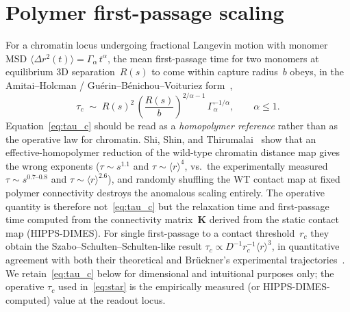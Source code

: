 \documentclass[11pt]{article}
\begin{document}
\section{Polymer first-passage scaling}
\label{sec:scaling}

For a chromatin locus undergoing fractional Langevin motion with monomer
MSD $\langle\Delta r^{2}(t)\rangle = \Gamma_{\alpha}\,t^{\alpha}$, the
mean first-passage time for two monomers at equilibrium 3D
separation~$R(s)$ to come within capture radius~$b$ obeys, in the
Amitai--Holcman / Gu\'erin--B\'enichou--Voituriez
form~\cite{Amitai2013,Guerin2016},
\begin{equation}
  \tau_c
  \;\sim\;
  R(s)^{2}\,\left(\frac{R(s)}{b}\right)^{2/\alpha-1}\,
  \Gamma_{\alpha}^{-1/\alpha},\qquad \alpha\le 1.
  \label{eq:tau_c}
\end{equation}
Equation~\eqref{eq:tau_c} should be read as a \emph{homopolymer reference}
rather than as the operative law for chromatin. Shi, Shin, and
Thirumalai~\cite{Shi2025} show that an effective-homopolymer reduction of
the wild-type chromatin distance map gives the wrong exponents
($\tau\sim s^{1.1}$ and $\tau\sim\langle r\rangle^{4}$, vs.\ the
experimentally measured $\tau\sim s^{0.7\text{--}0.8}$ and
$\tau\sim\langle r\rangle^{2.6}$), and randomly shuffling the WT contact
map at fixed polymer connectivity destroys the anomalous scaling
entirely. The operative quantity is therefore not~\eqref{eq:tau_c} but the
relaxation time and first-passage time computed from the connectivity
matrix~$\mathbf{K}$ derived from the static contact map (HIPPS-DIMES). For
single first-passage to a contact threshold~$r_c$ they obtain the
Szabo--Schulten--Schulten-like result $\tau_c\propto
D^{-1}r_c^{-1}\langle r\rangle^{3}$, in quantitative agreement with both
their theoretical and Br\"uckner's experimental
trajectories~\cite{Bruckner2023,Shi2025}. We retain~\eqref{eq:tau_c}
below for dimensional and intuitional purposes only; the operative
$\tau_c$ used in~\eqref{eq:star} is the empirically measured (or
HIPPS-DIMES-computed) value at the readout locus.
\end{document}
